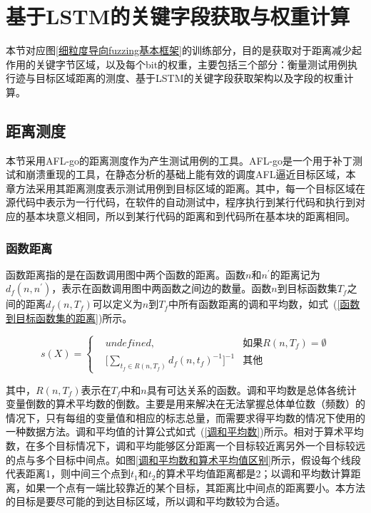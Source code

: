 \section{基于LSTM的关键字段获取与权重计算}
\label{基于LSTM的关键字段获取}

本节对应图\ref{细粒度导向fuzzing基本框架}的训练部分，目的是获取对于距离减少起作用的关键字节区域，以及每个bit的权重，主要包括三个部分：衡量测试用例执行迹与目标区域距离的测度、基于LSTM的关键字段获取架构以及字段的权重计算。

\subsection{距离测度}
\label{距离测度}

本节采用AFL-go的距离测度作为产生测试用例的工具。AFL-go是一个用于补丁测试和崩溃重现的工具，在静态分析的基础上能有效的调度AFL逼近目标区域，本章方法采用其距离测度表示测试用例到目标区域的距离。其中，每一个目标区域在源代码中表示为一行代码，在软件的自动测试中，程序执行到某行代码和执行到对应的基本块意义相同，所以到某行代码的距离和到代码所在基本块的距离相同。

\subsubsection{函数距离}

函数距离指的是在函数调用图中两个函数的距离。函数$n$和$n^{'}$的距离记为$d_{f}(n,n^{'})$，表示在函数调用图中两函数之间边的数量。函数$n$到目标函数集$T_f$之间的距离$d_f (n,T_f)$可以定义为$n$到$T_f$中所有函数距离的调和平均数，如式~(\ref{函数到目标函数集的距离})所示。

\begin{equation}\label{函数到目标函数集的距离}
s(X)=\left\{
\begin{aligned}
& undefined, & \text{如果} R(n, T_{f}) = \emptyset \\
& \lbrack \sum_{t_f \in R(n, T_{f})}d_{f}(n,t_{f})^{-1}\rbrack ^{-1} & \text{其他}
\end{aligned}
\right.
\end{equation} 

其中，$R(n,T_{f})$表示在$T_f$中和$n$具有可达关系的函数。调和平均数是总体各统计变量倒数的算术平均数的倒数。主要是用来解决在无法掌握总体单位数（频数）的情况下，只有每组的变量值和相应的标志总量，而需要求得平均数的情况下使用的一种数据方法。调和平均值的计算公式如式~(\ref{调和平均数})所示。相对于算术平均数，在多个目标情况下，调和平均能够区分距离一个目标较近离另外一个目标较远的点与多个目标中间点。如图\ref{调和平均数和算术平均值区别}所示，假设每个线段代表距离1，则中间三个点到$t_1$和$t_2$的算术平均值距离都是2；以调和平均数计算距离，如果一个点有一端比较靠近的某个目标，其距离比中间点的距离要小。本方法的目标是要尽可能的到达目标区域，所以调和平均数较为合适。


